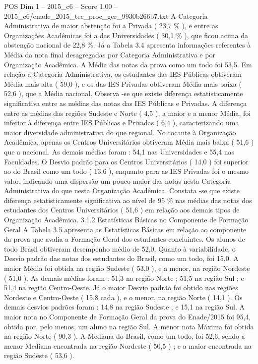 \begin{textsample}{POS Dim 1 – 2015\_c6 – Score 1.00 – 2015\_c6/enade\_2015\_tec\_proc\_ger\_9930b266b7.txt}
A Categoria Administrativa de maior abstenção foi a Privada ( 23,7 \% ), e entre as Organizações Acadêmicas foi a das Universidades ( 30,1 \% ), que ficou acima da abstenção nacional de 22,8 \%.
Já a Tabela 3.4 apresenta informações referentes à Média da nota final desagregadas por Categoria Administrativa e por Organização Acadêmica.
A Média das notas da prova como um todo foi 53,5.
Em relação à Categoria Administrativa, os estudantes das IES Públicas obtiveram Média mais alta ( 59,0 ), e os das IES Privadas obtiveram Média mais baixa ( 52,6 ), que a Média nacional.
Observa -se que existe diferença estatisticamente significativa entre as médias das notas das IES Públicas e Privadas.
A diferença entre as médias das regiões Sudeste e Norte ( 4,5 ), a maior e a menor Média, foi inferior à diferença entre IES Públicas e Privadas ( 6,4 ), caracterizando uma maior diversidade administrativa do que regional.
No tocante à Organização Acadêmica, apenas os Centros Universitários obtiveram Média mais baixa ( 51,6 ) que a nacional.
As demais médias foram : 54,1 nas Universidades e 55,4 nas Faculdades.
O Desvio padrão para os Centros Universitários ( 14,0 ) foi superior ao do Brasil como um todo ( 13,6 ), enquanto para as IES Privadas foi o mesmo valor, indicando uma dispersão um pouco maior das notas nesta Categoria Administrativa do que nesta Organização Acadêmica.
Constata -se que existe diferença estatisticamente significativa ao nível de 95 \% nas médias das notas dos estudantes dos Centros Universitários ( 51,6 ) em relação aos demais tipos de Organização Acadêmica. 3.1.2 Estatísticas Básicas no Componente de Formação Geral A Tabela 3.5 apresenta as Estatísticas Básicas em relação ao componente da prova que avalia a Formação Geral dos estudantes concluintes.
Os alunos de todo Brasil obtiveram desempenho médio de 52,0.
Quanto à variabilidade, o Desvio padrão das notas dos estudantes do Brasil, como um todo, foi 15,0.
A maior Média foi obtida na região Sudeste ( 53,0 ), e a menor, na região Nordeste ( 51,0 ).
As demais médias foram : 51,3 na região Norte ; 51,5 na região Sul ; e 51,4 na região Centro-Oeste.
Já o maior Desvio padrão foi obtido nas regiões Nordeste e Centro-Oeste ( 15,8 cada ), e o menor, na região Norte ( 14,1 ).
Os demais desvios padrões foram : 14,8 na região Sudeste ; e 15,1 na região Sul.
A maior nota no Componente de Formação Geral da prova do Enade/2015 foi 95,4, obtida por, pelo menos, um aluno na região Sul.
A menor nota Máxima foi obtida na região Norte ( 90,3 ).
A Mediana do Brasil, como um todo, foi 52,6, sendo a menor Mediana encontrada na região Nordeste ( 50,5 ) ; e a maior encontrada na região Sudeste ( 53,6 ).

\end{textsample}
